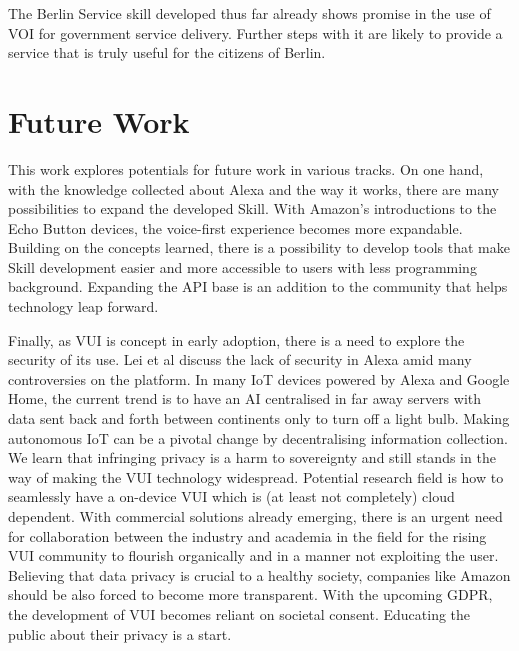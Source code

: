 The Berlin Service skill developed thus far already shows promise in the use of VOI for government service delivery. Further steps with it are likely to provide a service that is truly useful for the citizens of Berlin.












\section{Future Work}

This work explores potentials for future work in various tracks. On one hand, with the knowledge collected about Alexa and the way it works, there are many possibilities to expand the developed Skill. With Amazon's introductions to the Echo Button devices, the voice-first experience becomes more expandable. %
Building on the concepts learned, there is a possibility to develop tools that make Skill development easier and more accessible to users with less programming background. Expanding the API base is an addition to the community that helps technology leap forward.

Finally, as VUI is concept in early adoption, there is a need to explore the security of its use. Lei et al discuss the lack of security in Alexa\cite{lei} amid many controversies on the platform. In many IoT devices powered by Alexa and Google Home, the current trend is to have an AI centralised in far away servers with data sent back and forth between continents only to turn off a light bulb. Making autonomous IoT can be a pivotal change by decentralising information collection. We learn that infringing privacy is a harm to sovereignty and still stands in the way of making the VUI technology widespread. Potential research field is how to seamlessly have a on-device VUI which is (at least not completely) cloud dependent. With commercial solutions already emerging, there is an urgent need for collaboration between the industry and academia in the field for the rising VUI community to flourish organically and in a manner not exploiting the user. Believing that data privacy is crucial to a healthy society, companies like Amazon should be also forced to become more transparent. With the upcoming GDPR, the development of VUI becomes reliant on societal consent. Educating the public about their privacy is a start.

